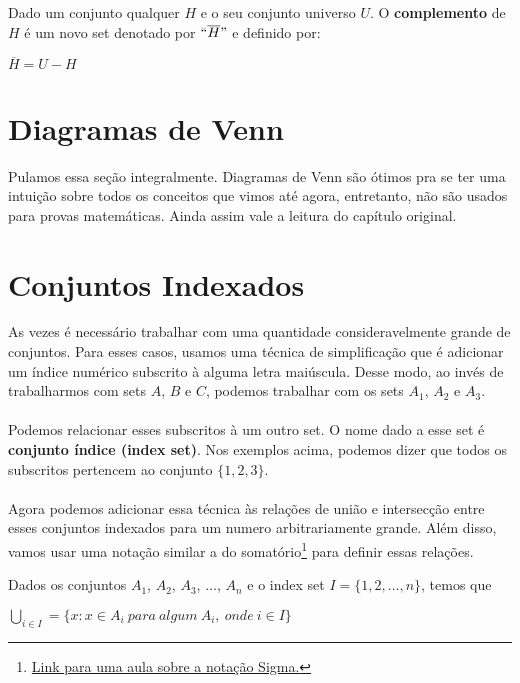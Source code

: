 \documentclass[main.tex]{subfiles}
\begin{document}
\begin{definition}[Complemento]
Dado um conjunto qualquer $H$ e o seu conjunto universo $U$. O \textbf{complemento} de $H$ é um novo set denotado por $``\overline{H}"$ e definido por:
\begin{center}
	$\overline{H} = U - H$
\end{center}
\end{definition}

\section{Diagramas de Venn}

Pulamos essa seção integralmente. Diagramas de Venn são ótimos pra se ter uma intuição sobre todos os conceitos que vimos até agora, entretanto, não são usados para provas matemáticas. Ainda assim vale a leitura do capítulo original.

\section{Conjuntos Indexados}

As vezes é necessário trabalhar com uma quantidade consideravelmente grande de conjuntos. Para esses casos, usamos uma técnica de simplificação que é adicionar um índice numérico subscrito à alguma letra maiúscula. Desse modo, ao invés de trabalharmos com sets $A$, $B$ e $C$, podemos trabalhar com os sets $A_1$, $A_2$ e $A_3$.
\\~\\
Podemos relacionar esses subscritos à um outro set. O nome dado a esse set é \textbf{conjunto índice (index set)}. Nos exemplos acima, podemos dizer que todos os subscritos pertencem ao conjunto $\{ 1 , 2 , 3 \}$.
\\~\\
Agora podemos adicionar essa técnica às relações de união e intersecção entre esses conjuntos indexados para um numero arbitrariamente grande. Além disso, vamos usar uma notação similar a do somatório\footnote{\href{https://pt.khanacademy.org/math/algebra2/sequences-and-series/alg2-sigma-notation/v/sigma-notation-sum}{Link para uma aula sobre a notação Sigma.}} para definir essas relações.

\begin{definition}
Dados os conjuntos $A_1$, $A_2$, $A_3$, $\dots$, $A_n$ e o index set $I = \{ 1 , 2 , \dots , n \}$, temos que
\begin{center}
	$\bigcup_{i \in I}\limits = \{ x : x \in A_i \ para \ algum \ A_i, \ onde \  i \in I \}$
\end{center}
\end{definition}
\end{document}
